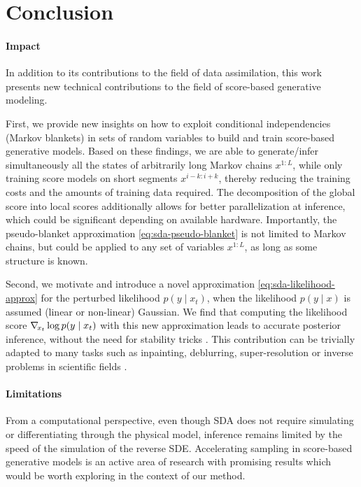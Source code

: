 \section{Conclusion}

\paragraph{Impact}
In addition to its contributions to the field of data assimilation, this work presents new technical contributions to the field of score-based generative modeling.

First, we provide new insights on how to exploit conditional independencies (Markov blankets) in sets of random variables to build and train score-based generative models. Based on these findings, we are able to generate/infer simultaneously all the states of arbitrarily long Markov chains $x^{1:L}$, while only training score models on short segments $x^{i-k:i+k}$, thereby reducing the training costs and the amounts of training data required. The decomposition of the global score into local scores additionally allows for better parallelization at inference, which could be significant depending on available hardware. Importantly, the pseudo-blanket approximation \eqref{eq:sda-pseudo-blanket} is not limited to Markov chains, but could be applied to any set of variables $x^{1:L}$, as long as some structure is known.

Second, we motivate and introduce a novel approximation \eqref{eq:sda-likelihood-approx} for the perturbed likelihood $p(y \mid x_t)$, when the likelihood $p(y \mid x)$ is assumed (linear or non-linear) Gaussian. We find that computing the likelihood score $\nabla_{\!{x_t}} \log p(y \mid x_t)$ with this new approximation leads to accurate posterior inference, without the need for stability tricks \cite{chung2023diffusion}. This contribution can be trivially adapted to many tasks such as inpainting, deblurring, super-resolution or inverse problems in scientific fields \cite{song2022solving, adam2022posterior, chung2023diffusion}.

\paragraph{Limitations}
From a computational perspective, even though SDA does not require simulating or differentiating through the physical model, inference remains limited by the speed of the simulation of the reverse SDE. Accelerating sampling in score-based generative models is an active area of research \cite{song2021denoising, liu2022pseudo, zhang2023fast, song2023consistency} with promising results which would be worth exploring in the context of our method.

